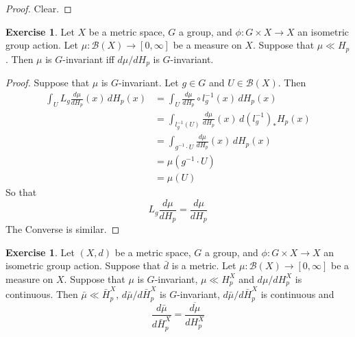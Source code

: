 \documentclass{book}
\theoremstyle{definition}
\newtheorem{ex}[definition]{Exercise}
\newcommand{\MB}{\mathcal{B}}
\DeclareMathOperator*{\0}{\mbf{0}}
\DeclareMathOperator*{\1}{\mbf{1}}
\begin{document}
	\begin{proof}
	Clear.
	\end{proof}
	
	\begin{ex}
	Let $X$ be a metric space, $G$ a group, and $\phi: G \times X \rightarrow X$ an isometric group action. Let $\mu: \MB(X) \rightarrow [0, \infty]$ be a measure on $X$. Suppose that $\mu \ll H_p$. Then $\mu$ is $G$-invariant iff $d\mu /d H_p$ is $G$-invariant.
	\end{ex}	
	
	\begin{proof}
	Suppose that $\mu$ is $G$-invariant. Let $g \in G$ and $U \in \MB(X)$. Then 
	\begin{align*}
	\int_U L_g \frac{d\mu}{d H_p}(x) \, d  H_p (x)
	&= \int_U \frac{d\mu}{d H_p} \circ l_{g}^{-1}(x) \, d  H_p(x) \\
	&= \int_{l_{g}^{-1}( U) } \frac{d\mu}{d H_p}(x) \, d (l_{g}^{-1})_*H_p(x) \\
	&= \int_{g^{-1} \cdot U } \frac{d\mu}{d H_p}(x) \, d H_p(x) \\
	&= \mu(g^{-1} \cdot U) \\
	&= \mu (U)
	\end{align*}
	So that \begin{equation*}
	L_g \frac{d\mu}{d H_p} = \frac{d\mu}{d H_p}
	\end{equation*}
	The Converse is similar.
	\end{proof}
	
	\begin{ex}
	Let $(X, d)$ be a metric space, $G$ a group, and $\phi: G \times X \rightarrow X$ an isometric group action. Suppose that $\bar{d}$ is a metric. Let $\mu: \MB(X) \rightarrow [0, \infty]$ be a measure on $X$. Suppose that $\mu$ is $G$-invariant, $\mu \ll H_p^X$ and $d\mu / dH_p^X$ is continuous. Then $\bar{\mu} \ll \bar{H}_p^X$, $d\bar{\mu}/d \bar{H}_p^X$ is $G$-invariant, $d\bar{\mu}/d \bar{H}_p^X$ is continuous and 
	\begin{equation*}
	\frac{d \bar{\mu}}{d \bar{H}_p^X} = \overline{\frac{d \mu}{d H_p^X}}
	\end{equation*}
	\end{ex}
	
\end{document}
